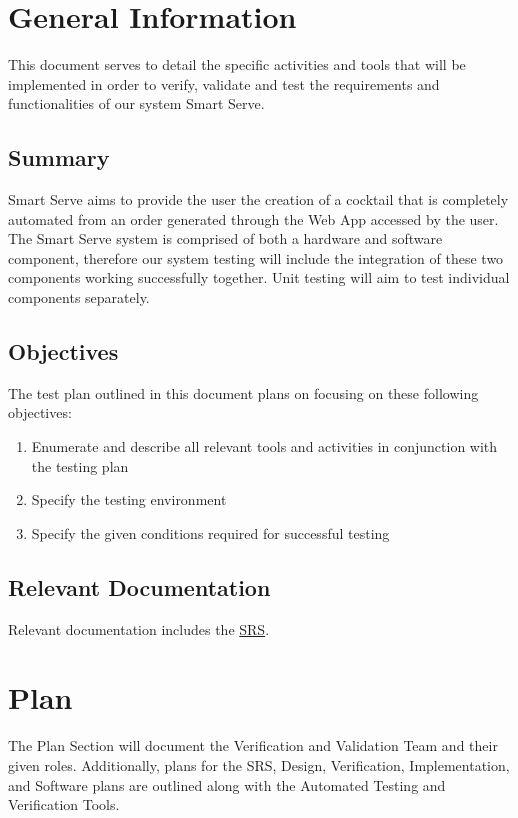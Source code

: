 \documentclass[12pt, titlepage]{article}
\begin{document}
\section{General Information}
This document serves to detail the specific activities and tools that will be implemented in order to verify, validate and test the requirements and functionalities of our system Smart Serve.  



\subsection{Summary}
Smart Serve aims to provide the user the creation of a cocktail that is completely automated from an order generated through the Web App accessed by the user. The Smart Serve system is comprised of both a hardware and software component, therefore our system testing will include the integration of these two components working successfully together. Unit testing will aim to test individual components separately. 

\subsection{Objectives}
The test plan outlined in this document plans on focusing on these following objectives:
\begin{enumerate}
    \item Enumerate and describe all relevant tools and activities in conjunction with the testing plan 
    \item Specify the testing environment 
    \item Specify the given conditions required for successful testing
    
\end{enumerate}

\subsection{Relevant Documentation}
Relevant documentation includes the \href{https://github.com/purefisher/Smart-Serve/blob/main/docs/SRS/SRS.pdf}{SRS}. 

\newpage
\section{Plan}
The Plan Section will document the Verification and Validation Team and their given roles. Additionally, plans for the SRS, Design, Verification, Implementation, and Software plans are outlined along with the Automated Testing and Verification Tools. 
\end{document}
